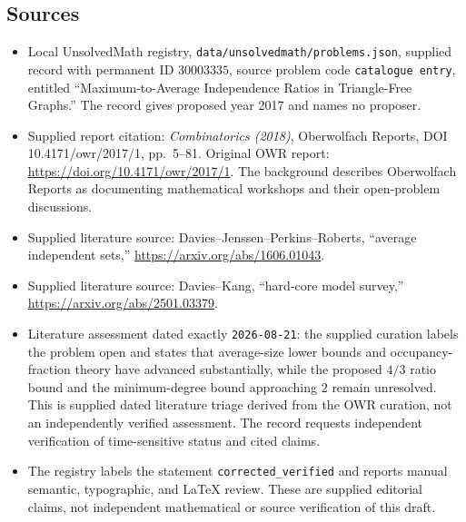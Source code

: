\documentclass[11pt]{article}
\begin{document}
\subsection{Sources}
\begin{itemize}
\item Local UnsolvedMath registry, \texttt{data/unsolvedmath/problems.json}, supplied record with permanent ID \(30003335\), source problem code \texttt{catalogue entry}, entitled ``Maximum-to-Average Independence Ratios in Triangle-Free Graphs.'' The record gives proposed year 2017 and names no proposer.
\item Supplied report citation: \emph{Combinatorics (2018)}, Oberwolfach Reports, DOI 10.4171/owr/2017/1, pp.\ 5--81. Original OWR report: \url{https://doi.org/10.4171/owr/2017/1}. The background describes Oberwolfach Reports as documenting mathematical workshops and their open-problem discussions.
\item Supplied literature source: Davies--Jenssen--Perkins--Roberts, ``average independent sets,'' \url{https://arxiv.org/abs/1606.01043}.
\item Supplied literature source: Davies--Kang, ``hard-core model survey,'' \url{https://arxiv.org/abs/2501.03379}.
\item Literature assessment dated exactly \texttt{2026-08-21}: the supplied curation labels the problem open and states that average-size lower bounds and occupancy-fraction theory have advanced substantially, while the proposed \(4/3\) ratio bound and the minimum-degree bound approaching \(2\) remain unresolved. This is supplied dated literature triage derived from the OWR curation, not an independently verified assessment. The record requests independent verification of time-sensitive status and cited claims.
\item The registry labels the statement \texttt{corrected\_verified} and reports manual semantic, typographic, and LaTeX review. These are supplied editorial claims, not independent mathematical or source verification of this draft.
\end{itemize}
\end{document}
